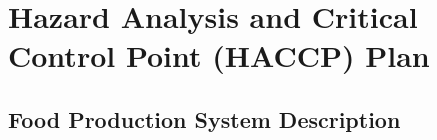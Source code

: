 \section{Hazard Analysis and Critical Control Point (HACCP) Plan}



\subsection{Food Production System Description}



